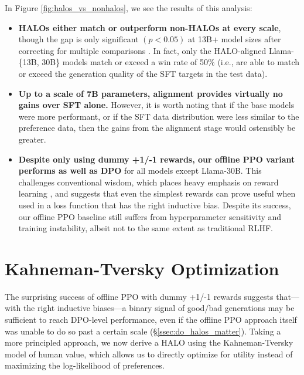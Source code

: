 In Figure \ref{fig:halos_vs_nonhalos}, we see the results of this analysis:
\begin{itemize}
    \item \textbf{HALOs either match or outperform non-HALOs at every scale}, though the gap is only significant $(p < 0.05)$ at 13B+ model sizes after correcting for multiple comparisons \citep{holm1979simple}.
    In fact, only the HALO-aligned Llama-\{13B, 30B\} models match or exceed a win rate of 50\% (i.e., are able to match or exceed the generation quality of the SFT targets in the test data).
    
    \item \textbf{Up to a scale of 7B parameters, alignment provides virtually no gains over SFT alone.}
    However, it is worth noting that if the base models were more performant, or if the SFT data distribution were less similar to the preference data, then the gains from the alignment stage would ostensibly be greater.

    \item \textbf{Despite only using dummy +1/-1 rewards, our offline PPO variant performs as well as DPO} for all models except Llama-30B.
    This challenges conventional wisdom, which places heavy emphasis on reward learning \cite{casper2023open}, and suggests that even the simplest rewards can prove useful when used in a loss function that has the right inductive bias.
    Despite its success, our offline PPO baseline still suffers from hyperparameter sensitivity and training instability, albeit not to the same extent as traditional RLHF. 
\end{itemize}

\section{Kahneman-Tversky Optimization}

The surprising success of offline PPO with dummy +1/-1 rewards suggests that---with the right inductive biases---a binary signal of good/bad generations may be sufficient to reach DPO-level performance, even if the offline PPO approach itself was unable to do so past a certain scale (\S\ref{ssec:do_halos_matter}).
Taking a more principled approach, we now derive a HALO using the Kahneman-Tversky model of human value, which allows us to directly optimize for utility instead of maximizing the log-likelihood of preferences.

